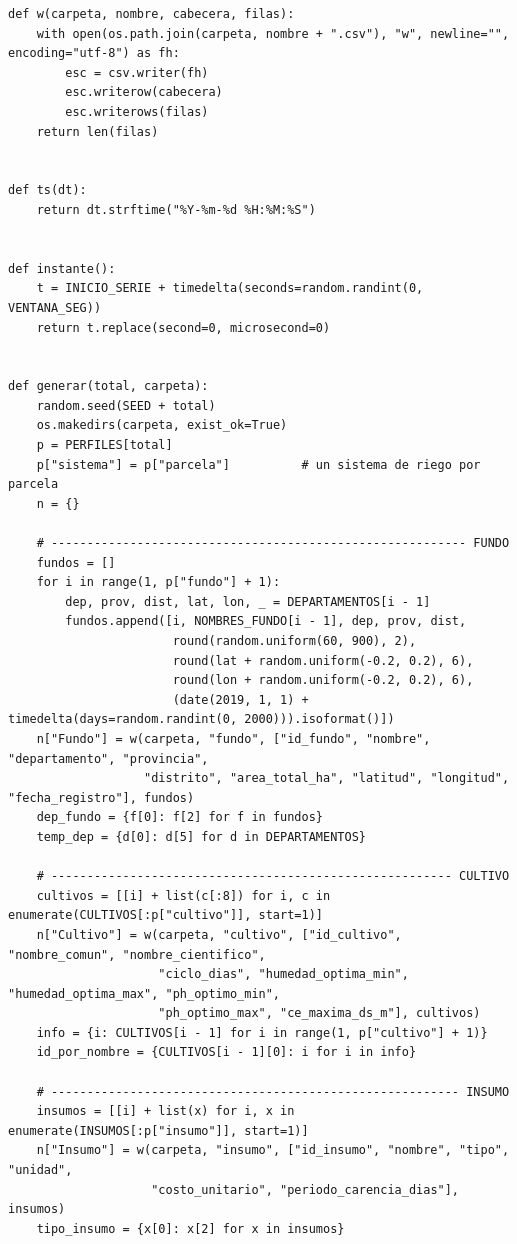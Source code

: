 \documentclass[11pt,letterpaper]{article}
\begin{document}
\begin{lstlisting}[style=py]
def w(carpeta, nombre, cabecera, filas):
    with open(os.path.join(carpeta, nombre + ".csv"), "w", newline="", encoding="utf-8") as fh:
        esc = csv.writer(fh)
        esc.writerow(cabecera)
        esc.writerows(filas)
    return len(filas)


def ts(dt):
    return dt.strftime("%Y-%m-%d %H:%M:%S")


def instante():
    t = INICIO_SERIE + timedelta(seconds=random.randint(0, VENTANA_SEG))
    return t.replace(second=0, microsecond=0)


def generar(total, carpeta):
    random.seed(SEED + total)
    os.makedirs(carpeta, exist_ok=True)
    p = PERFILES[total]
    p["sistema"] = p["parcela"]          # un sistema de riego por parcela
    n = {}

    # ---------------------------------------------------------- FUNDO
    fundos = []
    for i in range(1, p["fundo"] + 1):
        dep, prov, dist, lat, lon, _ = DEPARTAMENTOS[i - 1]
        fundos.append([i, NOMBRES_FUNDO[i - 1], dep, prov, dist,
                       round(random.uniform(60, 900), 2),
                       round(lat + random.uniform(-0.2, 0.2), 6),
                       round(lon + random.uniform(-0.2, 0.2), 6),
                       (date(2019, 1, 1) + timedelta(days=random.randint(0, 2000))).isoformat()])
    n["Fundo"] = w(carpeta, "fundo", ["id_fundo", "nombre", "departamento", "provincia",
                   "distrito", "area_total_ha", "latitud", "longitud", "fecha_registro"], fundos)
    dep_fundo = {f[0]: f[2] for f in fundos}
    temp_dep = {d[0]: d[5] for d in DEPARTAMENTOS}

    # -------------------------------------------------------- CULTIVO
    cultivos = [[i] + list(c[:8]) for i, c in enumerate(CULTIVOS[:p["cultivo"]], start=1)]
    n["Cultivo"] = w(carpeta, "cultivo", ["id_cultivo", "nombre_comun", "nombre_cientifico",
                     "ciclo_dias", "humedad_optima_min", "humedad_optima_max", "ph_optimo_min",
                     "ph_optimo_max", "ce_maxima_ds_m"], cultivos)
    info = {i: CULTIVOS[i - 1] for i in range(1, p["cultivo"] + 1)}
    id_por_nombre = {CULTIVOS[i - 1][0]: i for i in info}

    # --------------------------------------------------------- INSUMO
    insumos = [[i] + list(x) for i, x in enumerate(INSUMOS[:p["insumo"]], start=1)]
    n["Insumo"] = w(carpeta, "insumo", ["id_insumo", "nombre", "tipo", "unidad",
                    "costo_unitario", "periodo_carencia_dias"], insumos)
    tipo_insumo = {x[0]: x[2] for x in insumos}


\end{lstlisting}
\end{document}
